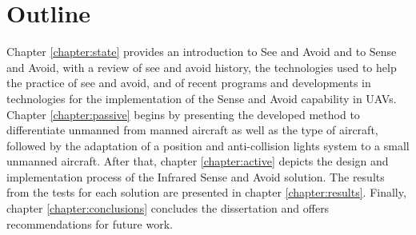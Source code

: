 \section{Outline}
\label{section:outline}
Chapter \ref{chapter:state} provides an introduction to See and Avoid and to Sense and Avoid, with a review of see and avoid history, the technologies used to help the practice of see and avoid, and of recent programs and developments in technologies for the implementation of the Sense and Avoid capability in UAVs. Chapter \ref{chapter:passive} begins by presenting the developed method to differentiate unmanned from manned aircraft as well as the type of aircraft, followed by the adaptation of a position and anti-collision lights system to a small unmanned aircraft. After that, chapter \ref{chapter:active} depicts the design and implementation process of the Infrared Sense and Avoid solution. The results from the tests for each solution are presented in chapter \ref{chapter:results}. Finally, chapter \ref{chapter:conclusions} concludes the dissertation and offers recommendations for future work.\\



%
%
%
%
%
%
%
%
%
%
%
%


%



